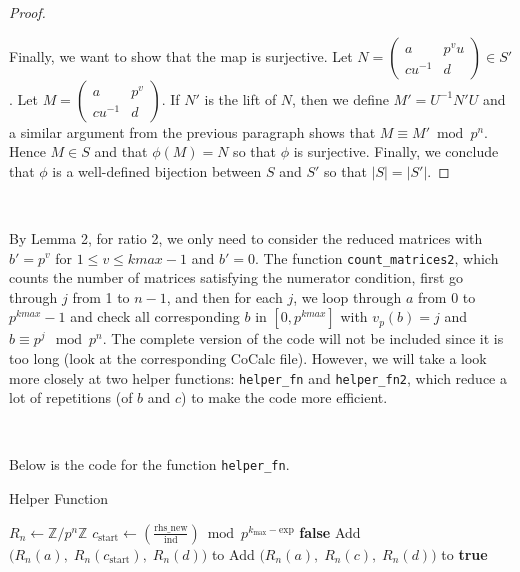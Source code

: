 \documentclass[letterpaper,12pt]{article}
\begin{document}
\begin{proof}
\

Finally, we want to show that the map is surjective.
Let $N = \begin{pmatrix}
a & p^v u \\ cu^{-1} & d
\end{pmatrix} \in S'$.
Let $M = \begin{pmatrix}
a & p^v \\ cu^{-1} & d
\end{pmatrix}$.
If $N'$ is the lift of $N$, then we define 
$M' = U^{-1}N'U$ and a similar argument from the previous paragraph 
shows that $M \equiv M' \bmod   p^n$.
Hence $M \in S$ and that $\phi(M) = N$ 
so that $\phi$ is surjective.
Finally, we conclude that $\phi$ is a well-defined bijection 
between $S$ and $S'$ so that $|S| = |S'|$.
\end{proof}


\

By Lemma 2, for ratio 2, we only need to 
consider the reduced matrices with $b' = p^v$ for $1 \leq v \leq kmax-1$ and $b' = 0$.
The function \texttt{count\_matrices2}, which counts the number of matrices 
satisfying the numerator condition, first go through $j$ from 1 to $n-1$,
and then for each $j$, we loop through $a$ from 0 to $p^{kmax} - 1$
and check all corresponding $b$ in $[0, p^{kmax}]$ with $v_p(b) = j$
and $b \equiv p^j \mod p^n$.
The complete version of the code will not be included since it is too long
(look at the corresponding CoCalc file).
However, we will take a look more closely 
at two helper functions: \texttt{helper\_fn} and \texttt{helper\_fn2},
which reduce a lot of repetitions (of $b$ and $c$) to make the code more efficient.

\

Below is the code for the function \texttt{helper\_fn}.

\begin{algorithm}
\caption{Helper Function}
\begin{algorithmic}[1]
    \State $R_n \gets \mathbb{Z}/p^n\mathbb{Z}$
    \State $c_{\text{start}} \gets \left( \frac{\text{rhs\_new}}{\text{ind}} \right) \bmod p^{k_{\max} - \text{exp}}$
        \State \Return \textbf{false}
    \EndIf
    \State Add $\big( R_n(a),\; R_n(c_{\text{start}}),\; R_n(d) \big)$ to 
        \State Add $\big( R_n(a),\; R_n(c),\; R_n(d) \big)$ to 
    \EndFor
    \State \Return \textbf{true}
\EndFunction
\end{algorithmic}
\end{algorithm}
\end{document}
